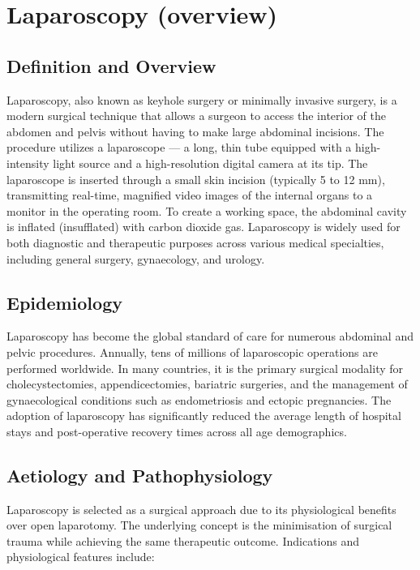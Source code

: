 \chapter{Laparoscopy (overview)}

\section*{Definition and Overview}
Laparoscopy, also known as keyhole surgery or minimally invasive surgery, is a modern surgical technique that allows a surgeon to access the interior of the abdomen and pelvis without having to make large abdominal incisions. The procedure utilizes a laparoscope --- a long, thin tube equipped with a high-intensity light source and a high-resolution digital camera at its tip. The laparoscope is inserted through a small skin incision (typically 5 to 12 mm), transmitting real-time, magnified video images of the internal organs to a monitor in the operating room. To create a working space, the abdominal cavity is inflated (insufflated) with carbon dioxide gas. Laparoscopy is widely used for both diagnostic and therapeutic purposes across various medical specialties, including general surgery, gynaecology, and urology.

\section*{Epidemiology}
Laparoscopy has become the global standard of care for numerous abdominal and pelvic procedures. Annually, tens of millions of laparoscopic operations are performed worldwide. In many countries, it is the primary surgical modality for cholecystectomies, appendicectomies, bariatric surgeries, and the management of gynaecological conditions such as endometriosis and ectopic pregnancies. The adoption of laparoscopy has significantly reduced the average length of hospital stays and post-operative recovery times across all age demographics.

\section*{Aetiology and Pathophysiology}
Laparoscopy is selected as a surgical approach due to its physiological benefits over open laparotomy. The underlying concept is the minimisation of surgical trauma while achieving the same therapeutic outcome. Indications and physiological features include:

